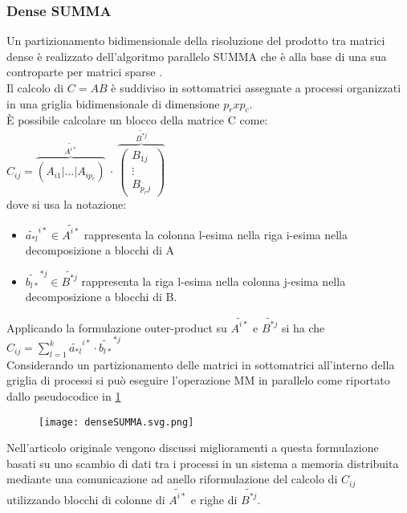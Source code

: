 \subsubsection{Dense SUMMA} %
Un partizionamento bidimensionale della risoluzione del prodotto tra matrici
dense è realizzato dell'algoritmo parallelo SUMMA \cite{denseSumma} che è alla
base di una sua controparte per matrici sparse \cite{sparseSUMMA}.\\
Il calcolo di $C=AB$ è suddiviso in sottomatrici assegnate a processi organizzati 
in una griglia bidimensionale di dimensione  $p_r x p_c$.\\
È possibile calcolare un blocco della matrice C come:
$C_{ij} =  \overbrace{\left(  A_{i1} | \dots |  A_{ip_c} \right)}^{\tilde{A^{i*}} }
~\cdot~ \overbrace{\left( 
        \begin{array}{c} B_{1j} \\ \vdots \\  B_{p_r j}
        \end{array} \right)} ^{\tilde{B^{*j}}} $\\
dove si usa la notazione:
\begin{itemize}
  \item $\tilde{a_{*l}}^{i*} \in \tilde{ A^{i*}}$ rappresenta 
    la colonna l-esima nella riga i-esima nella decomposizione a blocchi di A
  \item $\tilde{b_{l*}}^{*j} \in  \tilde{B^{*j}}$ rappresenta 
    la riga l-esima nella colonna j-esima nella decomposizione a blocchi di B.
\end{itemize}  
Applicando la formulazione outer-product su $\tilde{ A^{i*}}$ e $\tilde{B^{*j}}$
si ha che $C_{ij}=\sum\limits_{l=1}^{k}\tilde{a_{*l}}^{i*} \cdot \tilde{b_{l*}}^{*j}$\\
Considerando un partizionamento delle matrici in sottomatrici all'interno della
griglia di processi %
si può eseguire l'operazione MM in parallelo come riportato dallo pseudocodice
in \ref{figCode:denseSUMMA}\\
\begin{figure}[h!]
  \centering \texttt{[image: denseSUMMA.svg.png]}
  \caption[esecuzione dense SUMMA sul processo $P_{ij}$] \decoRule \label{figCode:denseSUMMA}
\end{figure}
Nell'articolo originale vengono discussi miglioramenti a questa formulazione
basati su uno scambio di dati tra i processi in un sistema a memoria distribuita
mediante una comunicazione ad anello 
riformulazione del calcolo di $C_{ij}$ utilizzando blocchi di
colonne di $\tilde{ A^{i*}}$ e righe di $\tilde{B^{*j}}$.\\

